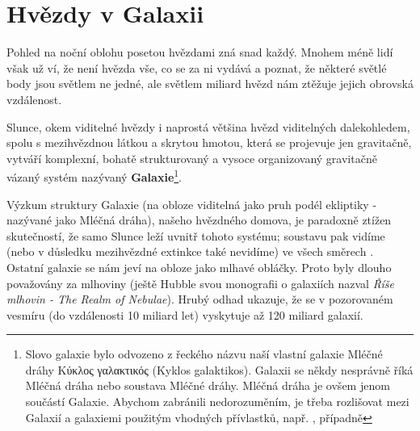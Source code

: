 \graphicspath{{../src/FYZ/img/}}
\setchaptertoc
\chapter{Hvězdy v Galaxii}\label{kulIchII}
  Pohled na noční oblohu posetou hvězdami zná snad každý. Mnohem méně lidí však už ví, že není
  hvězda vše, co se za ni vydává a poznat, že některé světlé body jsou světlem ne jedné, ale světlem
  miliard hvězd nám ztěžuje jejich obrovská vzdálenost.

  Slunce, okem viditelné hvězdy i naprostá většina hvězd viditelných dalekohledem, spolu s
  mezihvězdnou látkou a skrytou hmotou, která se projevuje jen gravitačně, vytváří komplexní, bohatě
  strukturovaný a vysoce organizovaný gravitačně vázaný systém nazývaný
  \textbf{Galaxie}\footnote{Slovo galaxie bylo odvozeno z řeckého názvu naší vlastní galaxie Mléčné
  dráhy Κύκλος γαλακτικός (Κyklos galaktikos). Galaxii se
  někdy nesprávně říká Mléčná dráha nebo soustava Mléčné dráhy. Mléčná dráha je ovšem jenom součástí
  Galaxie. Abychom zabránili nedorozuměním, je třeba rozlišovat mezi Galaxií a galaxiemi použitým
  vhodných přívlastků, např. ,  případně }. 

  Výzkum struktury Galaxie (na obloze viditelná jako pruh podél ekliptiky - nazývané jako Mléčná
  dráha), našeho hvězdného domova, je paradoxně ztížen skutečností, že samo Slunce leží uvnitř
  tohoto systému; soustavu pak vidíme (nebo v důsledku mezihvězdné extinkce také nevidíme) ve všech
  směrech \cite[s.~268]{Mikulasek2000}. Ostatní galaxie se nám jeví na obloze jako mlhavé obláčky.
  Proto byly dlouho považovány za mlhoviny (ještě Hubble svou monografii o galaxiích nazval
  \emph{Říše mlhovin - The Realm of Nebulae}). Hrubý odhad ukazuje, že se v pozorovaném vesmíru (do
  vzdálenosti 10 miliard let) vyskytuje až 120 miliard galaxií.

